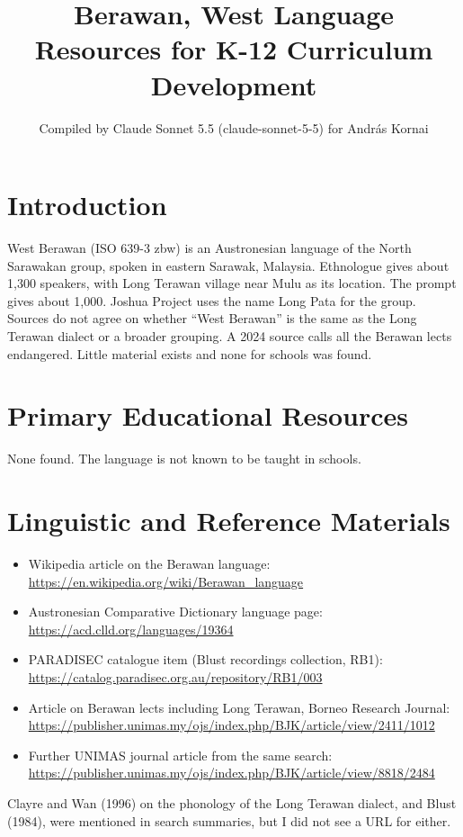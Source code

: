 \documentclass[12pt]{article}
\title{Berawan, West Language Resources for K-12 Curriculum Development}
\author{Compiled by Claude Sonnet 5.5 (claude-sonnet-5-5) for Andr\'as Kornai}
\date{}
\begin{document}
\maketitle

\section{Introduction}
West Berawan (ISO 639-3 zbw) is an Austronesian language of the North Sarawakan group, spoken in eastern Sarawak, Malaysia. Ethnologue gives about 1,300 speakers, with Long Terawan village near Mulu as its location. The prompt gives about 1,000. Joshua Project uses the name Long Pata for the group. Sources do not agree on whether ``West Berawan'' is the same as the Long Terawan dialect or a broader grouping. A 2024 source calls all the Berawan lects endangered. Little material exists and none for schools was found.

\section{Primary Educational Resources}
None found. The language is not known to be taught in schools.

\section{Linguistic and Reference Materials}
\begin{itemize}
\item Wikipedia article on the Berawan language: \url{https://en.wikipedia.org/wiki/Berawan_language}
\item Austronesian Comparative Dictionary language page: \url{https://acd.clld.org/languages/19364}
\item PARADISEC catalogue item (Blust recordings collection, RB1): \url{https://catalog.paradisec.org.au/repository/RB1/003}
\item Article on Berawan lects including Long Terawan, Borneo Research Journal: \url{https://publisher.unimas.my/ojs/index.php/BJK/article/view/2411/1012}
\item Further UNIMAS journal article from the same search: \url{https://publisher.unimas.my/ojs/index.php/BJK/article/view/8818/2484}
\end{itemize}
Clayre and Wan (1996) on the phonology of the Long Terawan dialect, and Blust (1984), were mentioned in search summaries, but I did not see a URL for either.
\end{document}

